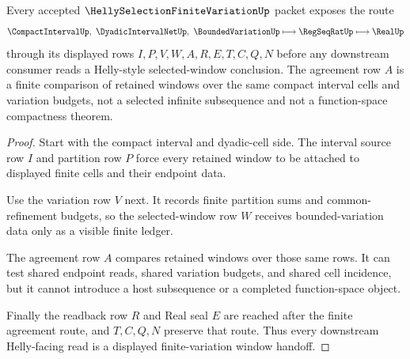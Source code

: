 \begin{theorem}
\label{thm:helly-selection-finite-variation-shared-window-route}
Every accepted $\HellySelectionFiniteVariationUp$ packet exposes the route
$$
\CompactIntervalUp,\ \DyadicIntervalNetUp,\ \BoundedVariationUp
\longmapsto
\RegSeqRatUp
\longmapsto
\RealUp
$$
through its displayed rows $I,P,V,W,A,R,E,T,C,Q,N$ before any downstream consumer reads a Helly-style selected-window conclusion. The agreement row $A$ is a finite comparison of retained windows over the same compact interval cells and variation budgets, not a selected infinite subsequence and not a function-space compactness theorem.
\end{theorem}
\begin{proof}
Start with the compact interval and dyadic-cell side. The interval source row $I$ and partition row $P$ force every retained window to be attached to displayed finite cells and their endpoint data.

Use the variation row $V$ next. It records finite partition sums and common-refinement budgets, so the selected-window row $W$ receives bounded-variation data only as a visible finite ledger.

The agreement row $A$ compares retained windows over those same rows. It can test shared endpoint reads, shared variation budgets, and shared cell incidence, but it cannot introduce a host subsequence or a completed function-space object.

Finally the readback row $R$ and Real seal $E$ are reached after the finite agreement route, and $T,C,Q,N$ preserve that route. Thus every downstream Helly-facing read is a displayed finite-variation window handoff.
\end{proof}



